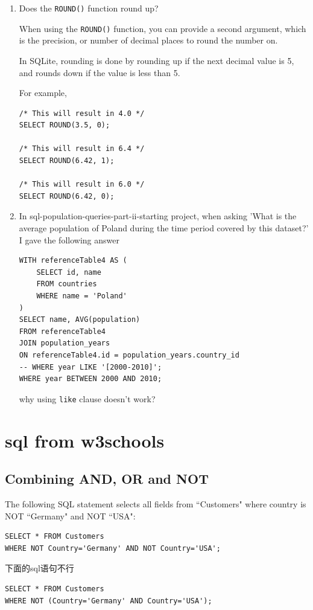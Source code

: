 \documentclass[a4paper, 12pt]{article}
\begin{document}
\begin{enumerate}
\item Does the \verb|ROUND()| function round up?

When using the \verb|ROUND()| function, you can provide a second argument, which is the precision, or number of decimal places to round the number on.

In SQLite, rounding is done by rounding up if the next decimal value is 5, and rounds down if the value is less than 5.

For example,
\begin{verbatim}
/* This will result in 4.0 */
SELECT ROUND(3.5, 0);

/* This will result in 6.4 */
SELECT ROUND(6.42, 1);

/* This will result in 6.0 */
SELECT ROUND(6.42, 0);
\end{verbatim}

\item In sql-population-queries-part-ii-starting project, when asking 'What is the average population of Poland during the time period covered by this dataset?' I gave the following answer
\begin{verbatim}
WITH referenceTable4 AS (
	SELECT id, name
	FROM countries
	WHERE name = 'Poland'
)
SELECT name, AVG(population)
FROM referenceTable4
JOIN population_years
ON referenceTable4.id = population_years.country_id
-- WHERE year LIKE '[2000-2010]';
WHERE year BETWEEN 2000 AND 2010;
\end{verbatim}
why using \verb|like| clause doesn't work?

\end{enumerate}



\section{sql from w3schools}
\subsection{Combining AND, OR and NOT}
The following SQL statement selects all fields from ``Customers" where country is NOT ``Germany" and NOT ``USA":
\begin{verbatim}
SELECT * FROM Customers
WHERE NOT Country='Germany' AND NOT Country='USA';
\end{verbatim}

下面的sql语句不行
\begin{verbatim}
SELECT * FROM Customers 
WHERE NOT (Country='Germany' AND Country='USA');
\end{verbatim}
\end{document}
